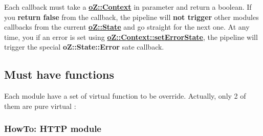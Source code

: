 Each callback must take a {\bfseries{\mbox{\hyperlink{classo_z_1_1_context}{o\+Z\+::\+Context}}}} in parameter and return a boolean. If you {\bfseries{return false}} from the callback, the pipeline will {\bfseries{not trigger}} other modules\textquotesingle{} callbacks from the current {\bfseries{\mbox{\hyperlink{namespaceo_z_a356b278f7c65def0cae75fca8cae268e}{o\+Z\+::\+State}}}} and go straight for the next one. At any time, you if an error is set using {\bfseries{\mbox{\hyperlink{classo_z_1_1_context_a036d993634650ee8414c2f12d49d0204}{o\+Z\+::\+Context\+::set\+Error\+State}}}}, the pipeline will trigger the special {\bfseries{o\+Z\+::\+State\+::\+Error}} sate callback.


\begin{DoxyCode}{0}
\DoxyCodeLine{\{}
\DoxyCodeLine{    \}}
\DoxyCodeLine{\}}
\end{DoxyCode}


\subsection*{Must have functions}

Each module have a set of virtual function to be override. Actually, only 2 of them are pure virtual \+: 
\begin{DoxyCode}{0}
\DoxyCodeLine{}
\end{DoxyCode}


\subsubsection*{How\+To\+: H\+T\+TP module}

